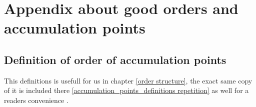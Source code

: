 \chapter{Appendix about good orders and accumulation points}
\section{Definition of order of accumulation points}
\label{accumulation_points_definitions} 

This definitions is usefull for us in chapter \ref{order structure}, the exact same copy 
of it is included there \ref{accumulation_points_definitions repetition} 
as well for a readers convenience .

